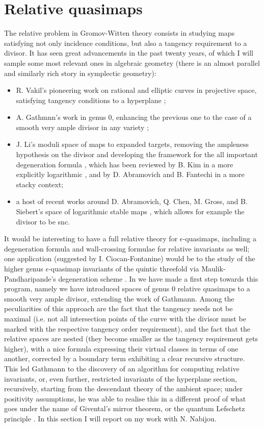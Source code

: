 \section{Relative quasimaps}\label{sec:rel_qm}
The relative problem in Gromov-Witten theory consists in studying maps satisfying not only incidence conditions, but also a tangency requirement to a divisor. It has seen great advancements in the past twenty years, of which I will sample some most relevant ones in algebraic geometry (there is an almost parallel and similarly rich story in symplectic geometry):
\begin{itemize}
 \item R. Vakil's pioneering work on rational and elliptic curves in projective space, satisfying tangency conditions to a hyperplane \cite{Vre};
 \item A. Gathmnn's work in genus $0$, enhancing the previous one to the case of a smooth very ample divisor in any variety \cite{Ga};
 \item J. Li's moduli space of maps to expanded targets, removing the ampleness hypothesis on the divisor and developing the framework for the all important degeneration formula \cite{Li1,Li2}, which has been reviewed by B. Kim in a more explicitly logarithmic \cite{KimLog}, and by D. Abramovich and B. Fantechi in a more stacky \cite{AbramovichFantechi} context;
 \item a host of recent works around D. Abramovich, Q. Chen, M. Gross, and B. Siebert's space of logarithmic stable maps \cite{ChenLog,AbramovichChenLog,GrossSiebertLog}, which allows for example the divisor to be snc.
\end{itemize}
It would be interesting to have a full relative theory for $\epsilon$-quasimaps, including a degeneration formula and wall-crossing formulae for relative invariants as well; one application (suggested by I. Ciocan-Fontanine) would be to the study of the higher genus $\epsilon$-quasimap invariants of the quintic threefold via Maulik-Pandharipande's degeneration scheme \cite{MauPan}. In \cite{BN} we have made a first step towards this program, namely we have introduced spaces of genus $0$ relative quasimaps to a smooth very ample divisor, extending the work of Gathmann. Among the peculiarities of this approach are the fact that the tangency needs not be maximal (i.e. not all intersection points of the curve with the divisor must be marked with the respective tangency order requirement), and the fact that the relative spaces are nested (they become smaller as the tangency requirement gets higher), with a nice formula expressing their virtual classes in terms of one another, corrected by a boundary term exhibiting a clear recursive structure. This led Gathmann to the discovery of an algorithm for computing relative invariants, or, even further, restricted invariants of the hyperplane section, recursively, starting from the descendant theory of the ambient space; under positivity assumptions, he was able to realise this in a different proof of what goes under the name of Givental's mirror theorem, or the quantum Lefschetz principle \cite{Ga-MF}. In this section I will report on my work with N. Nabijou.
